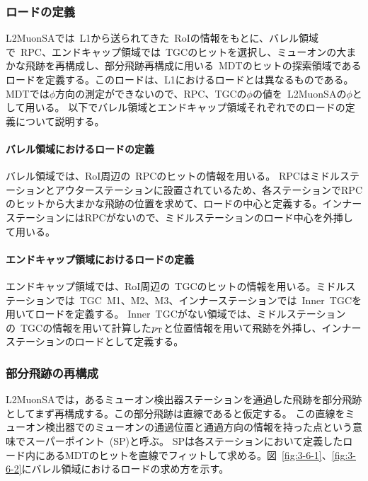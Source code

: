 \subsubsection{ロードの定義}
L2MuonSAでは~L1から送られてきた~RoIの情報をもとに、バレル領域で~RPC、エンドキャップ領域では~TGCのヒットを選択し、ミューオンの大まかな飛跡を再構成し、部分飛跡再構成に用いる~MDTのヒットの探索領域であるロードを定義する。このロードは、L1におけるロードとは異なるものである。MDTでは$\phi$方向の測定ができないので、RPC、TGCの$\phi$の値を~L2MuonSAの$\phi$として用いる。
以下でバレル領域とエンドキャップ領域それぞれでのロードの定義について説明する。

\paragraph{バレル領域におけるロードの定義}
バレル領域では、RoI周辺の~RPCのヒットの情報を用いる。
RPCはミドルステーションとアウターステーションに設置されているため、各ステーションでRPCのヒットから大まかな飛跡の位置を求めて、ロードの中心と定義する。インナーステーションにはRPCがないので、ミドルステーションのロード中心を外挿して用いる。

\paragraph{エンドキャップ領域におけるロードの定義}
エンドキャップ領域では、RoI周辺の~TGCのヒットの情報を用いる。ミドルステーションでは~TGC~M1、M2、M3、インナーステーションでは~Inner~TGCを用いてロードを定義する。
Inner~TGCがない領域では、ミドルステーションの~TGCの情報を用いて計算した$p_\mathrm{T}$と位置情報を用いて飛跡を外挿し、インナーステーションのロードとして定義する。

\subsubsection{部分飛跡の再構成}
L2MuonSAでは，あるミューオン検出器ステーションを通過した飛跡を部分飛跡としてまず再構成する。この部分飛跡は直線であると仮定する。
この直線をミューオン検出器でのミューオンの通過位置と通過方向の情報を持った点という意味でスーパーポイント~(SP)と呼ぶ。
SPは各ステーションにおいて定義したロード内にあるMDTのヒットを直線でフィットして求める。図~\ref{fig:3-6-1}、\ref{fig:3-6-2}にバレル領域におけるロードの求め方を示す。

